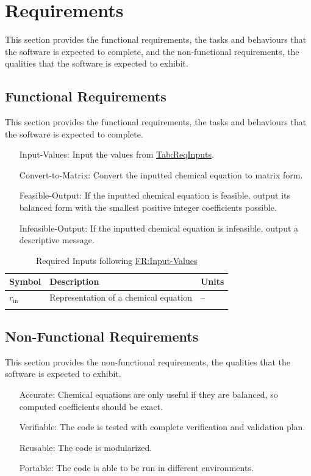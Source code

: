 \documentclass[12pt]{article}
\begin{document}
\section{Requirements}
\label{Sec:Requirements}
This section provides the functional requirements, the tasks and behaviours that the software is expected to complete, and the non-functional requirements, the qualities that the software is expected to exhibit.

\subsection{Functional Requirements}
\label{Sec:FRs}
This section provides the functional requirements, the tasks and behaviours that the software is expected to complete.

\begin{itemize}
\item[Input-Values:\phantomsection\label{inputValues}]{Input the values from \hyperref[Table:ReqInputs]{Tab:ReqInputs}.}
\item[Convert-to-Matrix:\phantomsection\label{convertMatrix}]{Convert the inputted chemical equation to matrix form.}
\item[Feasible-Output:\phantomsection\label{feasOut}]{If the inputted chemical equation is feasible, output its balanced form with the smallest positive integer coefficients possible.}
\item[Infeasible-Output:\phantomsection\label{infeasOut}]{If the inputted chemical equation is infeasible, output a descriptive message.}
\end{itemize}
\begin{longtable}{l l l}
\toprule
\textbf{Symbol} & \textbf{Description} & \textbf{Units}
\\
\midrule
\endhead
${r_{\text{in}}}$ & Representation of a chemical equation & --
\\
\bottomrule
\caption{Required Inputs following \hyperref[inputValues]{FR:Input-Values}}
\label{Table:ReqInputs}
\end{longtable}
\subsection{Non-Functional Requirements}
\label{Sec:NFRs}
This section provides the non-functional requirements, the qualities that the software is expected to exhibit.

\begin{itemize}
\item[Accurate:\phantomsection\label{accurate}]{Chemical equations are only useful if they are balanced, so computed coefficients should be exact.}
\item[Verifiable:\phantomsection\label{verifiable}]{The code is tested with complete verification and validation plan.}
\item[Reusable:\phantomsection\label{reusable}]{The code is modularized.}
\item[Portable:\phantomsection\label{portable}]{The code is able to be run in different environments.}
\end{itemize}
\end{document}
